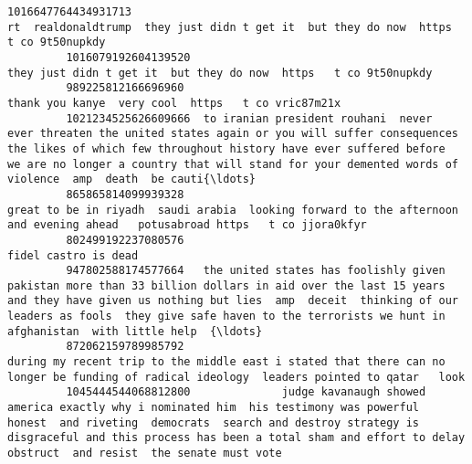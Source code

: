 \documentclass[11pt]{article}
\begin{document}
\begin{Verbatim}[commandchars=\\\{\}]
         1016647764434931713                                                                                                                                                                                                   rt  realdonaldtrump  they just didn t get it  but they do now  https   t co 9t50nupkdy   
         1016079192604139520                                                                                                                                                                                                                        they just didn t get it  but they do now  https   t co 9t50nupkdy   
         989225812166696960                                                                                                                                                                                                                                       thank you kanye  very cool  https   t co vric87m21x   
         1021234525626609666  to iranian president rouhani  never  ever threaten the united states again or you will suffer consequences the likes of which few throughout history have ever suffered before  we are no longer a country that will stand for your demented words of violence  amp  death  be cauti{\ldots}   
         865865814099939328                                                                                                                                                             great to be in riyadh  saudi arabia  looking forward to the afternoon and evening ahead   potusabroad https   t co jjora0kfyr   
         802499192237080576                                                                                                                                                                                                                                                                     fidel castro is dead    
         947802588174577664   the united states has foolishly given pakistan more than 33 billion dollars in aid over the last 15 years  and they have given us nothing but lies  amp  deceit  thinking of our leaders as fools  they give safe haven to the terrorists we hunt in afghanistan  with little help  {\ldots}   
         872062159789985792                                                                                                                                               during my recent trip to the middle east i stated that there can no longer be funding of radical ideology  leaders pointed to qatar   look    
         1045444544068812800              judge kavanaugh showed america exactly why i nominated him  his testimony was powerful  honest  and riveting  democrats  search and destroy strategy is disgraceful and this process has been a total sham and effort to delay  obstruct  and resist  the senate must vote    

\end{Verbatim}
\end{document}
